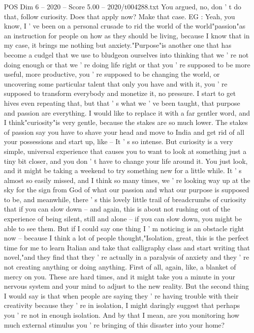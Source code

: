 \begin{textsample}{POS Dim 6 – 2020 – Score 5.00 – 2020/t004288.txt}
You argued, no, don ' t do that, follow curiosity.
Does that apply now?
Make that case.
EG : Yeah, you know, I ' ve been on a personal crusade to rid the world of the world"passion"as an instruction for people on how as they should be living, because I know that in my case, it brings me nothing but anxiety."Purpose"is another one that has become a cudgel that we use to bludgeon ourselves into thinking that we ' re not doing enough or that we ' re doing life right or that you ' re supposed to be more useful, more productive, you ' re supposed to be changing the world, or uncovering some particular talent that only you have and with it, you ' re supposed to transform everybody and monetize it, no pressure.
I start to get hives even repeating that, but that ' s what we ' ve been taught, that purpose and passion are everything.
I would like to replace it with a far gentler word, and I think"curiosity"is very gentle, because the stakes are so much lower.
The stakes of passion say you have to shave your head and move to India and get rid of all your possessions and start up, like -- It ' s so intense.
But curiosity is a very simple, universal experience that causes you to want to look at something just a tiny bit closer, and you don ' t have to change your life around it.
You just look, and it might be taking a weekend to try something new for a little while.
It ' s almost so easily missed, and I think so many times, we ' re looking way up at the sky for the sign from God of what our passion and what our purpose is supposed to be, and meanwhile, there ' s this lovely little trail of breadcrumbs of curiosity that if you can slow down -- and again, this is about not rushing out of the experience of being silent, still and alone -- if you can slow down, you might be able to see them.
But if I could say one thing I ' m noticing is an obstacle right now -- because I think a lot of people thought,"Isolation, great, this is the perfect time for me to learn Italian and take that calligraphy class and start writing that novel,"and they find that they ' re actually in a paralysis of anxiety and they ' re not creating anything or doing anything.
First of all, again, like, a blanket of mercy on you.
These are hard times, and it might take you a minute in your nervous system and your mind to adjust to the new reality.
But the second thing I would say is that when people are saying they ' re having trouble with their creativity because they ' re in isolation, I might daringly suggest that perhaps you ' re not in enough isolation.
And by that I mean, are you monitoring how much external stimulus you ' re bringing of this disaster into your home?

\end{textsample}
